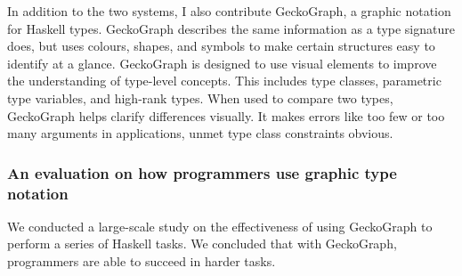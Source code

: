 In addition to the two systems, I also contribute GeckoGraph, a graphic notation for Haskell types. GeckoGraph describes the same information as a type signature does, but uses colours, shapes, and symbols to make certain structures easy to identify at a glance. GeckoGraph is designed to use visual elements to improve the understanding of type-level concepts. This includes type classes, parametric type variables, and high-rank types. When used to compare two types, GeckoGraph helps clarify differences visually. It makes errors like too few or too many arguments in applications, unmet type class constraints obvious.

\subsubsection{An evaluation on how programmers use graphic type notation}

We conducted a large-scale study on the effectiveness of using GeckoGraph to perform a series of Haskell tasks. We concluded that with GeckoGraph, programmers are able to succeed in harder tasks.







